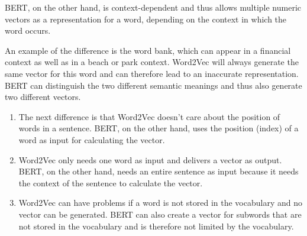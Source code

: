 BERT, on the other hand, is context-dependent and thus allows multiple numeric vectors as a representation for a word, depending on the context in which the word occurs.

An example of the difference is the word bank, which can appear in a financial context as well as in a beach or park context. Word2Vec will always generate the same vector for this word and can therefore lead to an inaccurate representation. BERT can distinguish the two different semantic meanings and thus also generate two different vectors.

\begin{enumerate}
	\item The next difference is that Word2Vec doesn't care about the position of words in a sentence. BERT, on the other hand, uses the position (index) of a word as input for calculating the vector.
	\item Word2Vec only needs one word as input and delivers a vector as output. BERT, on the other hand, needs an entire sentence as input because it needs the context of the sentence to calculate the vector.
	\item Word2Vec can have problems if a word is not stored in the vocabulary and no vector can be generated. BERT can also create a vector for subwords that are not stored in the vocabulary and is therefore not limited by the vocabulary.
\end{enumerate}

